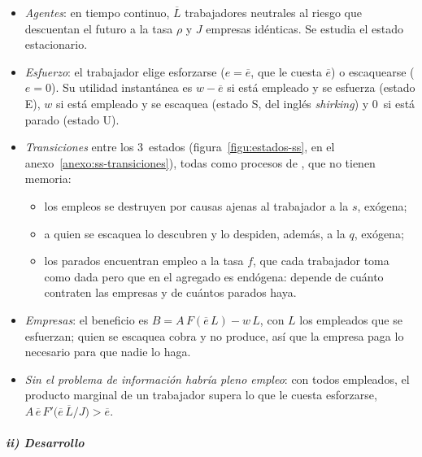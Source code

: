 \documentclass[11pt]{article}
\begin{document}
\begin{itemize}
\item \emph{Agentes}: en tiempo continuo, $\overline{L}$ trabajadores neutrales al riesgo que descuentan el futuro a la tasa $\rho$ y $J$ empresas idénticas. Se estudia el estado estacionario.
\item \emph{Esfuerzo}: el trabajador elige esforzarse ($e=\overline{e}$, que le cuesta $\overline{e}$) o escaquearse ($e=0$). Su utilidad instantánea es $w-\overline{e}$ si está empleado y se esfuerza (estado E), $w$ si está empleado y se escaquea (estado S, del inglés \emph{shirking}) y 0~si está parado (estado U).
\item \emph{Transiciones} entre los 3~estados (figura~\ref{figu:estados-ss}, en el anexo~\ref{anexo:ss-transiciones}), todas como procesos de , que no tienen memoria:
  \begin{itemize}
  \item los empleos se destruyen por causas ajenas al trabajador a la  $s$, exógena;
  \item a quien se escaquea lo descubren y lo despiden, además, a la  $q$, exógena;
  \item los parados encuentran empleo a la tasa $f$, que cada trabajador toma como dada pero que en el agregado es endógena: depende de cuánto contraten las empresas y de cuántos parados haya.
  \end{itemize}
\item \emph{Empresas}: el beneficio es $B=A\,F(\overline{e}\,L)-w\,L$, con $L$ los empleados que se esfuerzan; quien se escaquea cobra y no produce, así que la empresa paga lo necesario para que nadie lo haga.
\item \emph{Sin el problema de información habría pleno empleo}: con todos empleados, el producto marginal de un trabajador supera lo que le cuesta esforzarse, $A\,\overline{e}\,F'\big(\overline{e}\,\overline{L}/J\big)>\overline{e}$.
\end{itemize}

\subparagraph{ii) Desarrollo}
\end{document}
